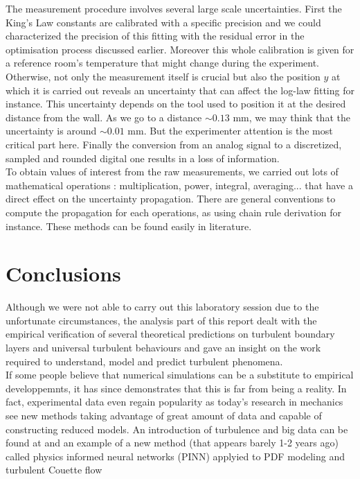 \documentclass[12pt]{article}
\begin{document}
The measurement procedure involves several large scale uncertainties. First the King's Law constants are calibrated with a specific precision and we could characterized the precision of this fitting with the residual error in the optimisation process discussed earlier. Moreover this whole calibration is given for a reference room's temperature that might change during the experiment. Otherwise, not only the measurement itself is crucial but also the position $y$ at which it is carried out reveals an uncertainty that can affect the log-law fitting for instance. This uncertainty depends on the tool used to position it at the desired distance from the wall. As we go to a distance $\sim 0.13$ \si{mm}, we may think that the uncertainty is around $\sim 0.01$ \si{mm}. But the experimenter attention is the most critical part here. Finally the conversion from an analog signal to a discretized, sampled and rounded digital one results in a loss of information.\\

To obtain values of interest from the raw measurements, we carried out lots of mathematical operations : multiplication, power, integral, averaging... that have a direct effect on the uncertainty propagation. There are general conventions to compute the propagation for each operations, as using chain rule derivation for instance. These methods can be found easily in literature. 

\newpage

\section{Conclusions}



Although we were not able to carry out this laboratory session due to the unfortunate circumstances, the analysis part of this report dealt with the empirical verification of several theoretical predictions on turbulent boundary layers and universal turbulent behaviours and gave an insight on the work required to understand, model and predict turbulent phenomena. \\

If some people believe that numerical simulations can be a substitute to empirical developpemnts, it has since demonstrates that this is far from being a reality. In fact, experimental data even regain popularity as today's research in mechanics see new methods taking advantage of great amount of data and capable of constructing reduced models. An introduction of turbulence and big data can be found at \cite{pollardWhitherTurbulenceBig} and an example of a new method (that appears barely 1-2 years ago) called physics informed neural networks (PINN) applyied to PDF modeling \cite{raissi...} and turbulent Couette flow \cite{mehtaDiscoveringUniversalVariableorder2019}
\end{document}
